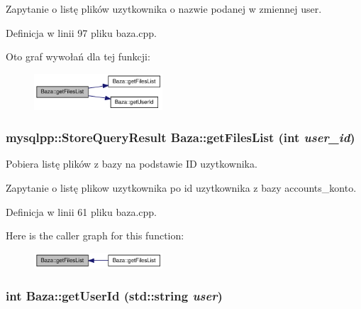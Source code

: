 Zapytanie o listę plików uzytkownika o nazwie podanej w zmiennej user. 

Definicja w linii 97 pliku baza.cpp.

Oto graf wywołań dla tej funkcji:\nopagebreak
\begin{figure}[H]
\begin{center}
\leavevmode
\includegraphics[width=136pt]{d8/d84/a00001_2eace36725672b3a4ce639f91fe7d9bd_cgraph}
\end{center}
\end{figure}
\hypertarget{a00001_02db3388d088212bd443ee39998b5cf8}{
\subsubsection[{getFilesList}]{\setlength{\rightskip}{0pt plus 5cm}mysqlpp::StoreQueryResult Baza::getFilesList (int {\em user\_\-id})}}
\label{d8/d84/a00001_02db3388d088212bd443ee39998b5cf8}


Pobiera listę plików z bazy na podstawie ID uzytkownika. 

Zapytanie o listę plikow uzytkownika po id uzytkownika z bazy accounts\_\-konto. 

Definicja w linii 61 pliku baza.cpp.

Here is the caller graph for this function:\nopagebreak
\begin{figure}[H]
\begin{center}
\leavevmode
\includegraphics[width=136pt]{d8/d84/a00001_02db3388d088212bd443ee39998b5cf8_icgraph}
\end{center}
\end{figure}
\hypertarget{a00001_65054f08c8fd7c600f6c2fe2c7f61a43}{
\subsubsection[{getUserId}]{\setlength{\rightskip}{0pt plus 5cm}int Baza::getUserId (std::string {\em user})}}
\label{d8/d84/a00001_65054f08c8fd7c600f6c2fe2c7f61a43}


